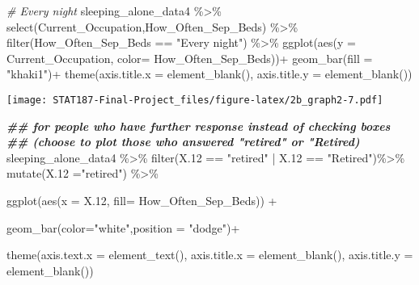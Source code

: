 \documentclass[
]{article}
\newenvironment{Shaded}{\begin{snugshade}}{\end{snugshade}}
\newcommand{\AttributeTok}[1]{\textcolor[rgb]{0.77,0.63,0.00}{#1}}
\newcommand{\CommentTok}[1]{\textcolor[rgb]{0.56,0.35,0.01}{\textit{#1}}}
\newcommand{\DocumentationTok}[1]{\textcolor[rgb]{0.56,0.35,0.01}{\textbf{\textit{#1}}}}
\newcommand{\FloatTok}[1]{\textcolor[rgb]{0.00,0.00,0.81}{#1}}
\newcommand{\FunctionTok}[1]{\textcolor[rgb]{0.00,0.00,0.00}{#1}}
\newcommand{\NormalTok}[1]{#1}
\newcommand{\SpecialCharTok}[1]{\textcolor[rgb]{0.00,0.00,0.00}{#1}}
\newcommand{\StringTok}[1]{\textcolor[rgb]{0.31,0.60,0.02}{#1}}
\begin{document}
\begin{Shaded}
\begin{Highlighting}[]
\CommentTok{\# Every night}
\NormalTok{sleeping\_alone\_data4 }\SpecialCharTok{\%\textgreater{}\%}
  \FunctionTok{select}\NormalTok{(Current\_Occupation,How\_Often\_Sep\_Beds) }\SpecialCharTok{\%\textgreater{}\%}
  \FunctionTok{filter}\NormalTok{(How\_Often\_Sep\_Beds }\SpecialCharTok{==} \StringTok{"Every night"}\NormalTok{) }\SpecialCharTok{\%\textgreater{}\%}
  \FunctionTok{ggplot}\NormalTok{(}\FunctionTok{aes}\NormalTok{(}\AttributeTok{y =}\NormalTok{ Current\_Occupation,}
              \AttributeTok{color=}\NormalTok{ How\_Often\_Sep\_Beds))}\SpecialCharTok{+}
  \FunctionTok{geom\_bar}\NormalTok{(}\AttributeTok{fill =} \StringTok{"khaki1"}\NormalTok{)}\SpecialCharTok{+}
  \FunctionTok{theme}\NormalTok{(}\AttributeTok{axis.title.x =} \FunctionTok{element\_blank}\NormalTok{(),}
        \AttributeTok{axis.title.y =} \FunctionTok{element\_blank}\NormalTok{())}
\end{Highlighting}
\end{Shaded}

\texttt{[image: STAT187-Final-Project\_files/figure-latex/2b\_graph2-7.pdf]}

\begin{Shaded}
\begin{Highlighting}[]
\DocumentationTok{\#\# for people who have further response instead of checking boxes}
\DocumentationTok{\#\# (choose to plot those who answered "retired" or "Retired)}
\NormalTok{sleeping\_alone\_data4 }\SpecialCharTok{\%\textgreater{}\%}
  \FunctionTok{filter}\NormalTok{(X}\FloatTok{.12} \SpecialCharTok{==} \StringTok{"retired"} \SpecialCharTok{|}\NormalTok{ X}\FloatTok{.12} \SpecialCharTok{==} \StringTok{"Retired"}\NormalTok{)}\SpecialCharTok{\%\textgreater{}\%}
  \FunctionTok{mutate}\NormalTok{(}\AttributeTok{X.12 =}\StringTok{"retired"}\NormalTok{) }\SpecialCharTok{\%\textgreater{}\%}
  
  \FunctionTok{ggplot}\NormalTok{(}\FunctionTok{aes}\NormalTok{(}\AttributeTok{x =}\NormalTok{ X}\FloatTok{.12}\NormalTok{, }\AttributeTok{fill=}\NormalTok{ How\_Often\_Sep\_Beds)) }\SpecialCharTok{+}
  
  \FunctionTok{geom\_bar}\NormalTok{(}\AttributeTok{color=}\StringTok{"white"}\NormalTok{,}\AttributeTok{position =} \StringTok{"dodge"}\NormalTok{)}\SpecialCharTok{+}
  
  \FunctionTok{theme}\NormalTok{(}\AttributeTok{axis.text.x =} \FunctionTok{element\_text}\NormalTok{(),}
        \AttributeTok{axis.title.x =} \FunctionTok{element\_blank}\NormalTok{(),}
        \AttributeTok{axis.title.y =} \FunctionTok{element\_blank}\NormalTok{()) }
\end{Highlighting}
\end{Shaded}
\end{document}
